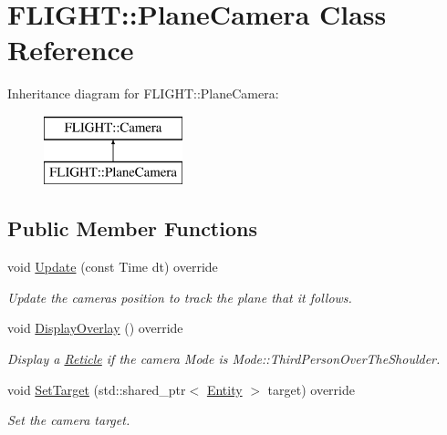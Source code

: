 \hypertarget{class_f_l_i_g_h_t_1_1_plane_camera}{}\section{F\+L\+I\+G\+HT\+:\+:Plane\+Camera Class Reference}
\label{class_f_l_i_g_h_t_1_1_plane_camera}
Inheritance diagram for F\+L\+I\+G\+HT\+:\+:Plane\+Camera\+:\begin{figure}[H]
\begin{center}
\leavevmode
\includegraphics[height=2.000000cm]{class_f_l_i_g_h_t_1_1_plane_camera}
\end{center}
\end{figure}
\subsection*{Public Member Functions}
\begin{DoxyCompactItemize}
\item 
void \hyperlink{class_f_l_i_g_h_t_1_1_plane_camera_a806e8a07ea8fad7aee17de4fbbf075c5}{Update} (const Time dt) override
\begin{DoxyCompactList}\small\item\em Update the camera\textquotesingle{}s position to track the plane that it follows. \end{DoxyCompactList}\item 
\mbox{\label{class_f_l_i_g_h_t_1_1_plane_camera_af30e27a90e880803572bc66547827d03}} 
void \hyperlink{class_f_l_i_g_h_t_1_1_plane_camera_af30e27a90e880803572bc66547827d03}{Display\+Overlay} () override
\begin{DoxyCompactList}\small\item\em Display a \hyperlink{class_f_l_i_g_h_t_1_1_reticle}{Reticle} if the camera Mode is Mode\+::\+Third\+Person\+Over\+The\+Shoulder. \end{DoxyCompactList}\item 
void \hyperlink{class_f_l_i_g_h_t_1_1_plane_camera_a2015a019a4008c3e7f8080df34d115b3}{Set\+Target} (std\+::shared\+\_\+ptr$<$ \hyperlink{class_f_l_i_g_h_t_1_1_entity}{Entity} $>$ target) override
\begin{DoxyCompactList}\small\item\em Set the camera target. \end{DoxyCompactList}\end{DoxyCompactItemize}


